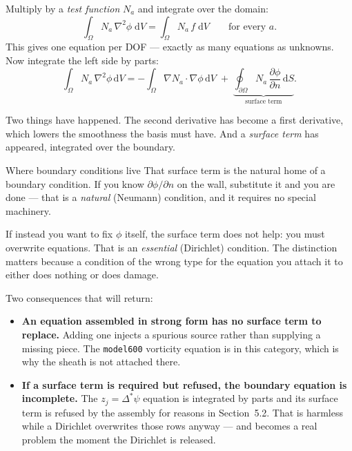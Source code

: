 \documentclass[11pt,a4paper]{article}
\newcommand{\zj}{z_j}
\newcommand{\dd}{\mathrm{d}}
\newcommand{\code}[1]{\texttt{\small #1}}
\begin{document}
Multiply by a \emph{test function} $N_a$ and integrate over the domain:
\begin{equation}
  \int_\Omega N_a\,\nabla^2\phi \;\dd V = \int_\Omega N_a\,f\;\dd V \qquad \text{for every } a.
\end{equation}
This gives one equation per DOF --- exactly as many equations as unknowns. Now integrate the
left side by parts:
\begin{equation}
  \int_\Omega N_a\,\nabla^2\phi\,\dd V
  = -\int_\Omega \nabla N_a\!\cdot\!\nabla\phi\,\dd V
  \;+\; \underbrace{\oint_{\partial\Omega} N_a\,\frac{\partial\phi}{\partial n}\,\dd S}_{\text{surface term}} .
  \label{eq:byparts}
\end{equation}

Two things have happened. The second derivative has become a first derivative, which lowers the
smoothness the basis must have. And a \emph{surface term} has appeared, integrated over the boundary.

\begin{concept}{Where boundary conditions live}
That surface term is the natural home of a boundary condition. If you know $\partial\phi/\partial n$
on the wall, substitute it and you are done --- that is a \emph{natural} (Neumann) condition, and it
requires no special machinery.

If instead you want to fix $\phi$ itself, the surface term does not help: you must overwrite
equations. That is an \emph{essential} (Dirichlet) condition. The distinction matters because a
condition of the wrong type for the equation you attach it to either does nothing or does damage.
\end{concept}

Two consequences that will return:

\begin{itemize}\itemsep3pt
\item \textbf{An equation assembled in strong form has no surface term to replace.} Adding one
  injects a spurious source rather than supplying a missing piece. The \code{model600} vorticity
  equation is in this category, which is why the sheath is not attached there.
\item \textbf{If a surface term is required but refused, the boundary equation is incomplete.} The
  $\zj=\Delta^{*}\psi$ equation is integrated by parts and its surface term is refused by the
  assembly for reasons in Section~5.2. That is harmless while a Dirichlet overwrites those rows
  anyway --- and becomes a real problem the moment the Dirichlet is released.
\end{itemize}
\end{document}
